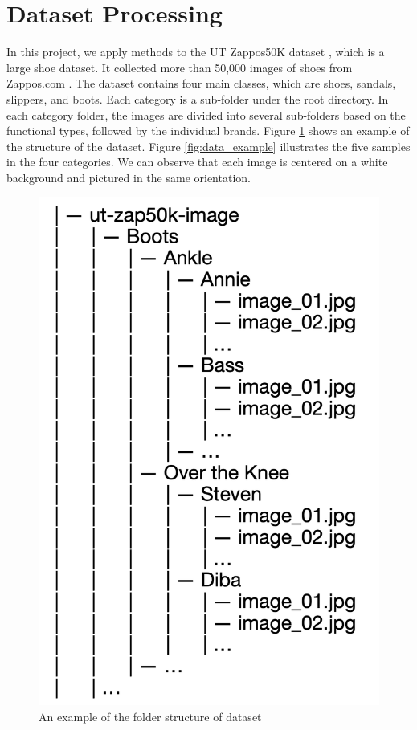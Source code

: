 \section{Dataset Processing}

In this project, we apply methods to the UT Zappos50K dataset \cite{}, which is a large shoe dataset. It collected more than 50,000 images of shoes from Zappos.com \cite{}. The dataset contains four main classes, which are shoes, sandals, slippers, and boots. Each category is a sub-folder under the root directory. In each category folder, the images are divided into several sub-folders based on the functional types, followed by the individual brands. Figure \ref{fig:data_folder} shows an example of the structure of the dataset. Figure \ref{fig:data_example} illustrates the five samples in the four categories. We can observe that each image is centered on a white background and pictured in the same orientation. 

\begin{figure}[h]
	\includegraphics[width=0.5\linewidth]{figs/data_folder.png}
	\caption{An example of the folder structure of dataset }
	\label{fig:data_folder}
\end{figure}

